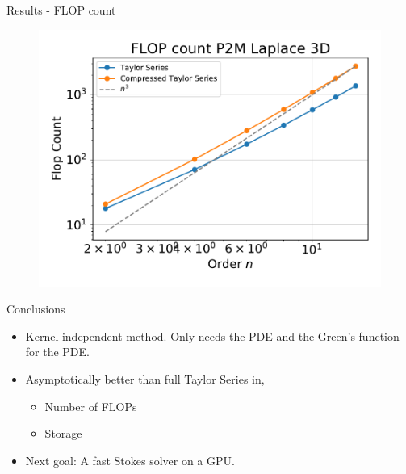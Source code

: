 \documentclass[10pt]{beamer}
\begin{document}
\begin{frame}[fragile]{Results - FLOP count}
\begin{figure}
\includegraphics[scale=0.3]{figures/flops-laplace-P2M-3d.pdf}
\end{figure}
\end{frame}

\begin{frame}[fragile]{Conclusions}
\begin{itemize}
 \item Kernel independent method. Only needs the PDE and the Green's function for the PDE.
 \item Asymptotically better than full Taylor Series in,
    \begin{itemize}
     \item Number of FLOPs
     \item Storage
    \end{itemize}
  \item Next goal: A fast Stokes solver on a GPU.
\end{itemize}

\end{frame}
\end{document}
